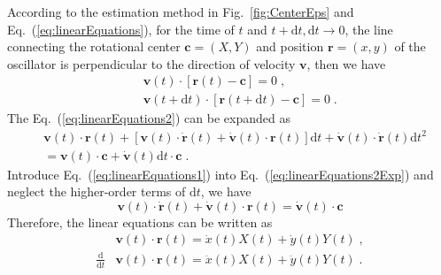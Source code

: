 \documentclass[%
 aip,
 amsmath,amssymb,
 reprint,%
]{revtex4-1}
\begin{document}
According to the estimation method in Fig.~\ref{fig:CenterEps} and Eq.~(\ref{eq:linearEquations}), for the time of $t$ and $t+\mathrm{d}t, \mathrm{d}t\rightarrow 0$, the line connecting the rotational center $\mathbf{c}=(X,Y)$ and position $\mathbf{r}=(x,y)$ of the oscillator is perpendicular to the direction of velocity $\mathbf{v}$, then we have
\begin{eqnarray}
        &&\mathbf{v}\left( t \right) \cdot \left[ \mathbf{r}\left( t \right) -\mathbf{c} \right] =0\;,\label{eq:linearEquations1}
        \\
        &&\mathbf{v}\left( t+\mathrm{d}t \right) \cdot \left[ \mathbf{r}\left( t+\mathrm{d}t \right) -\mathbf{c} \right] =0\;.\label{eq:linearEquations2}
\end{eqnarray}
The Eq.~(\ref{eq:linearEquations2}) can be expanded as
\begin{equation}\label{eq:linearEquations2Exp}
    \begin{aligned}
        &\mathbf{v}\left( t \right) \cdot \mathbf{r}\left( t \right) +\left[ \mathbf{v}\left( t \right) \cdot \dot{\mathbf{r}}\left( t \right) +\dot{\mathbf{v}}\left( t \right) \cdot \mathbf{r}\left( t \right) \right] \mathrm{d}t+\dot{\mathbf{v}}\left( t \right) \cdot \dot{\mathbf{r}}\left( t \right) \mathrm{d}t^2 \\
        &=\mathbf{v}\left( t \right) \cdot \mathbf{c}+\dot{\mathbf{v}}\left( t \right) \mathrm{d}t\cdot \mathbf{c}\;.
    \end{aligned}
\end{equation}
Introduce Eq.~(\ref{eq:linearEquations1}) into Eq.~(\ref{eq:linearEquations2Exp}) and neglect the higher-order terms of $\mathrm{d}t$, we have
\begin{equation}
    \mathbf{v}\left( t \right) \cdot \dot{\mathbf{r}}\left( t \right) +\dot{\mathbf{v}}\left( t \right) \cdot \mathbf{r}\left( t \right) =\dot{\mathbf{v}}\left( t \right) \cdot \mathbf{c}
\end{equation}
Therefore, the linear equations can be written as
\begin{equation}
    \begin{aligned}
        &\mathbf{v}\left( t \right) \cdot \mathbf{r}\left( t \right) =\dot{x}\left( t \right) X\left( t \right) +\dot{y}\left( t \right) Y\left( t \right) \;,\\
        \frac{\mathrm{d}}{\mathrm{d}t}&\mathbf{v}\left( t \right) \cdot \mathbf{r}\left( t \right) =\ddot{x}\left( t \right) X\left( t \right) +\ddot{y}\left( t \right) Y\left( t \right)\;.\\
    \end{aligned}
\end{equation}
\end{document}
